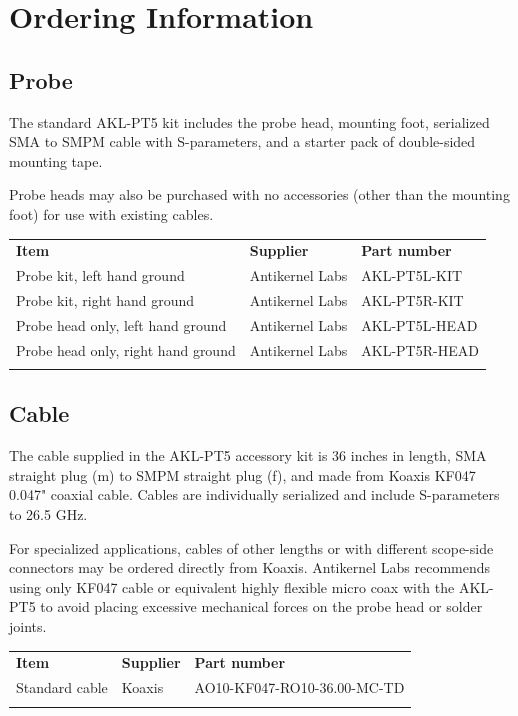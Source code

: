 \documentclass[11pt]{article}
\newcommand{\thinhline}{\Xhline{1\arrayrulewidth}}
\newcommand{\thickhline}{\Xhline{2.5\arrayrulewidth}}
\begin{document}
\pagebreak
\section{Ordering Information}
\label{ordering-info}

\subsection{Probe}

The standard AKL-PT5 kit includes the probe head, mounting foot, serialized SMA to SMPM cable with S-parameters, and a
starter pack of double-sided mounting tape.

Probe heads may also be purchased with no accessories (other than the mounting foot) for use with existing cables.

\begin{tabularx}{16cm}{llX}
\thickhline
\textbf{Item} & \textbf{Supplier} & \textbf{Part number} \\
\thickhline
Probe kit, left hand ground & Antikernel Labs & AKL-PT5L-KIT \\
\thinhline
Probe kit, right hand ground & Antikernel Labs & AKL-PT5R-KIT \\
\thinhline
Probe head only, left hand ground & Antikernel Labs & AKL-PT5L-HEAD \\
\thinhline
Probe head only, right hand ground & Antikernel Labs & AKL-PT5R-HEAD \\
\thickhline
\end{tabularx}

\subsection{Cable}

The cable supplied in the AKL-PT5 accessory kit is 36 inches in length, SMA straight plug (m) to SMPM straight plug
(f), and made from Koaxis KF047 0.047" coaxial cable. Cables are individually serialized and include S-parameters to
26.5 GHz.

For specialized applications, cables of other lengths or with different scope-side connectors may be ordered directly
from Koaxis. Antikernel Labs recommends using only KF047 cable or equivalent highly flexible micro coax with the
AKL-PT5 to avoid placing excessive mechanical forces on the probe head or solder joints.

\begin{tabularx}{16cm}{llX}
\thickhline
\textbf{Item} & \textbf{Supplier} & \textbf{Part number} \\
\thickhline
Standard cable & Koaxis & AO10-KF047-RO10-36.00-MC-TD \\
\thickhline
\end{tabularx}
\end{document}
